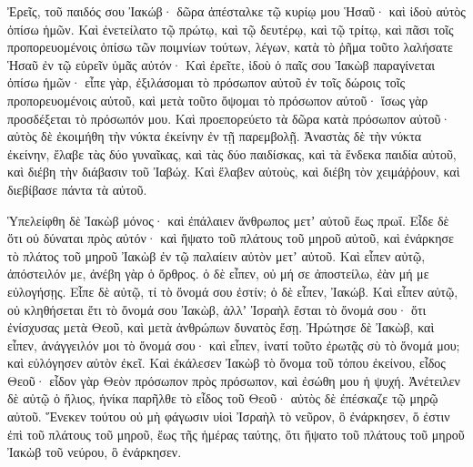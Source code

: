 {Ἐρεῖς, τοῦ παιδός σου Ἰακώβ· δῶρα ἀπέσταλκε τῷ κυρίῳ μου Ἡσαῦ· καὶ ἰδοὺ αὐτὸς ὀπίσω ἡμῶν.
Καὶ ἐνετείλατο τῷ πρώτῳ, καὶ τῷ δευτέρῳ, καὶ τῷ τρίτῳ, καὶ πᾶσι τοῖς προπορευομένοις ὀπίσω τῶν ποιμνίων τούτων, λέγων, κατὰ τὸ ῥῆμα τοῦτο λαλήσατε Ἡσαῦ ἐν τῷ εὑρεῖν ὑμᾶς αὐτόν·
Καὶ ἐρεῖτε, ἰδοὺ ὁ παῖς σου Ἰακὼβ παραγίνεται ὀπίσω ἡμῶν· εἶπε γὰρ, ἐξιλάσομαι τὸ πρόσωπον αὐτοῦ ἐν τοῖς δώροις τοῖς προπορευομένοις αὐτοῦ, καὶ μετὰ τοῦτο ὄψομαι τὸ πρόσωπον αὐτοῦ· ἴσως γὰρ προσδέξεται τὸ πρόσωπόν μου.
Καὶ προεπορεύετο τὰ δῶρα κατὰ πρόσωπον αὐτοῦ· αὐτὸς δὲ ἐκοιμήθη τὴν νύκτα ἐκείνην ἐν τῇ παρεμβολῇ.
Ἀναστὰς δὲ τὴν νύκτα ἐκείνην, ἔλαβε τὰς δύο γυναῖκας, καὶ τὰς δύο παιδίσκας, καὶ τὰ ἕνδεκα παιδία αὐτοῦ, καὶ διέβη τὴν διάβασιν τοῦ Ἰαβώχ.
Καὶ ἔλαβεν αὐτοὺς, καὶ διέβη τὸν χειμάῤῥουν, καὶ διεβίβασε πάντα τὰ αὐτοῦ.
\par }{\PP {}Ὑπελείφθη δὲ Ἰακὼβ μόνος· καὶ ἐπάλαιεν ἄνθρωπος μετʼ αὐτοῦ ἕως πρωΐ.
Εἶδε δὲ ὅτι οὐ δύναται πρὸς αὐτόν· καὶ ἥψατο τοῦ πλάτους τοῦ μηροῦ αὐτοῦ, καὶ ἐνάρκησε τὸ πλάτος τοῦ μηροῦ Ἰακὼβ ἐν τῷ παλαίειν αὐτὸν μετʼ αὐτοῦ.
Καὶ εἶπεν αὐτῷ, ἀπόστειλόν με, ἀνέβη γὰρ ὁ ὄρθρος. ὁ δὲ εἶπεν, οὐ μή σε ἀποστείλω, ἐὰν μή με εὐλογήσῃς.
Εἶπε δὲ αὐτῷ, τί τὸ ὄνομά σου ἐστίν; ὁ δὲ εἶπεν, Ἰακώβ.
Καὶ εἶπεν αὐτῷ, οὐ κληθήσεται ἔτι τὸ ὄνομά σου Ἰακὼβ, ἀλλʼ Ἰσραὴλ ἔσται τὸ ὄνομά σου· ὅτι ἐνίσχυσας μετὰ Θεοῦ, καὶ μετὰ ἀνθρώπων δυνατὸς ἔσῃ.
Ἠρώτησε δὲ Ἰακὼβ, καὶ εἶπεν, ἀνάγγειλόν μοι τὸ ὄνομά σου· καὶ εἶπεν, ἱνατί τοῦτο ἐρωτᾷς σὺ τὸ ὄνομά μου; καὶ εὐλόγησεν αὐτὸν ἐκεῖ.
Καὶ ἐκάλεσεν Ἰακὼβ τὸ ὄνομα τοῦ τόπου ἐκείνου, εἶδος Θεοῦ· εἶδον γὰρ Θεὸν πρόσωπον πρὸς πρόσωπον, καὶ ἐσώθη μου ἡ ψυχή.
Ἀνέτειλεν δὲ αὐτῷ ὁ ἥλιος, ἡνίκα παρῆλθε τὸ εἶδος τοῦ Θεοῦ· αὐτὸς δὲ ἐπέσκαζε τῷ μηρῷ αὐτοῦ.
Ἕνεκεν τούτου οὐ μὴ φάγωσιν υἱοὶ Ἰσραὴλ τὸ νεῦρον, ὃ ἐνάρκησεν, ὅ ἐστιν ἐπὶ τοῦ πλάτους τοῦ μηροῦ, ἕως τῆς ἡμέρας ταύτης, ὅτι ἥψατο τοῦ πλάτους τοῦ μηροῦ Ἰακὼβ τοῦ νεύρου, ὃ ἐνάρκησεν.

}
